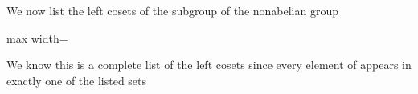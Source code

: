 \documentclass[11pt,oneside]{article}
\begin{document}
\begin{BookBody}
 We now list the left cosets of the subgroup  of the nonabelian group 

\begin{center}\begin{adjustbox}{max width=\linewidth}\end{adjustbox}\end{center}

\noindent We know this is a complete list of the left cosets since every element of  appears in exactly one of the listed sets\BookEnd{\blacktriangle}

\end{BookBody}

\BookNarrativetrue
\end{document}
